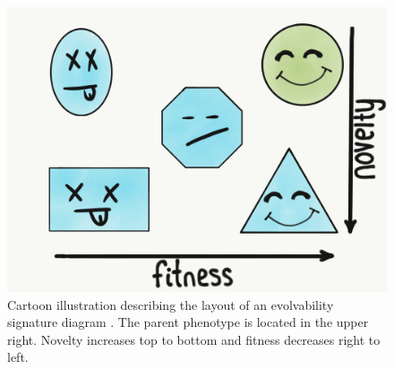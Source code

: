 \begin{figure}
  \includegraphics[width=0.8\linewidth]{img/reading_evolvability_signature}
  \caption{Cartoon illustration describing the layout of an evolvability signature diagram \cite{tarapore2015evolvability}. The parent phenotype is located in the upper right. Novelty increases top to bottom and fitness decreases right to left.}
  \label{fig:reading_evolvability_signature}
\end{figure}
